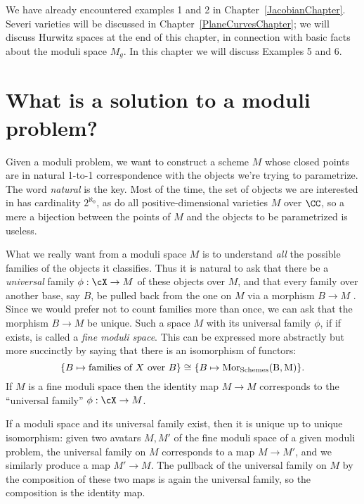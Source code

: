 We have already encountered examples 1 and 2 in Chapter~\ref{JacobianChapter}. Severi varieties will be discussed in Chapter~\ref{PlaneCurvesChapter}; we will discuss Hurwitz spaces at the end of this chapter, in connection with basic facts about the moduli space $M_g$. In this chapter we will discuss Examples 5 and 6.



\section{What is a solution to a moduli problem?}

Given a moduli problem, we want to construct a scheme $M$ whose closed points are in natural  1-to-1 correspondence with the objects we're trying to parametrize. The word \emph{natural} is the key. Most of the time, the set of objects we are interested in has cardinality $2^{\aleph_0}$, as do all positive-dimensional varieties $M$ over $\CC$, so a mere a bijection between the points of $M$ and the objects to be parametrized is useless.

What we really want from a moduli space $M$ is to understand \emph{all} the possible families of the objects it classifies. Thus it is natural to ask that there be a \emph{universal} family $\phi: \cX\to M$ of these objects over $M$,
and that every family over another base, say $B$,  be pulled back from the one on $M$ via a morphism $B\to M$ . Since we would prefer not to count families more than once, we can ask that the 
morphism $B\to M$ be unique. Such a space $M$ with its universal family $\phi$, if if exists, is called a \emph{fine moduli space}. This can be expressed more abstractly but more succinctly by saying that there is an isomorphism of functors:
$$
\{ B \mapsto \text{families of } X \text{ over } B \} \cong \{ B\mapsto \rm{Mor}_{\rm Schemes}(B, M) \}.
$$
If $M$ is a fine moduli space then the identity map $M\to M$ corresponds to the ``universal family'' $\phi: \cX \to M$. 

If a moduli space and its universal family exist, then it is unique up to unique isomorphism: given two avatars $M,M'$ of the fine moduli space of a given moduli problem,
the universal family on $M$ corresponds to a map $M\to M'$, and we similarly produce a map $M'\to M$. The pullback of the universal family on $M$ by the composition of these two maps is again the universal family, so the composition is the identity map.

